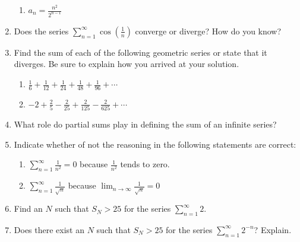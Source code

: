 \documentclass{nosvagor-notes}
\begin{document}
\begin{enumerate}
\begin{enumerate}
      \item \(\displaystyle a_n = \frac{n^2}{2^{n-1}}\)
    \end{enumerate}

  \newpage

  \item Does the series \(\displaystyle \sum_{n=1}^{\infty} \cos \left(
    \frac{1}{n} \right) \) converge or diverge? How do you know?
    \vspace{160pt}

  \item Find the sum of each of the following geometric series or state that it
    diverges. Be sure to explain how you arrived at your solution.
    \begin{enumerate}
      \item \(\frac{1}{6} + \frac{1}{12} + \frac{1}{24} + \frac{1}{48} + \frac{1}{96} + \cdots\)
      \vspace{200pt}

      \item \(-2 + \frac{2}{5} - \frac{2}{25} + \frac{2}{125} - \frac{2}{625} + \cdots \)
    \end{enumerate}
  \newpage

  \item What role do partial sums play in defining the sum of an infinite
    series?
    \vspace{90pt}

  \item Indicate whether of not the reasoning in the following statements are
    correct:
    \begin{enumerate}
      \item \(\displaystyle \sum_{n=1}^{\infty} \frac{1}{n^2} = 0\) because
        \(\frac{1}{n^2}\) tends to zero.
      \vspace{110pt}

      \item \(\displaystyle \sum_{n=1}^{\infty} \frac{1}{\sqrt{n}}\) because
        \(\displaystyle \lim_{n \to \infty}\frac{1}{\sqrt{n} } = 0\)
      \vspace{110pt}
    \end{enumerate}

  \item Find an \(N\) such that \(S_N > 25\) for the series \(\displaystyle
    \sum_{n=1}^{\infty} 2\).
    \vspace{110pt}

  \item Does there exist an \(N\) such that \(S_N > 25\) for the series
    \(\sum_{n=1}^{\infty} 2^{-n}\)? Explain.
    \vspace{90pt}


\end{enumerate}
\end{document}
